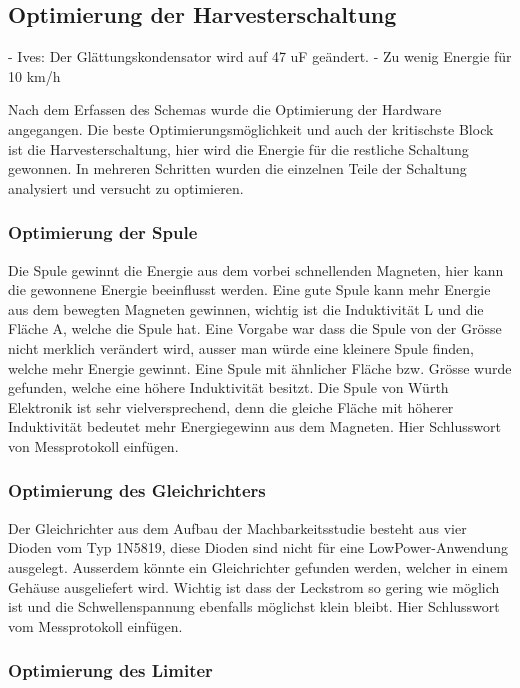 \subsection{Optimierung der Harvesterschaltung}
- Ives: Der Glättungskondensator wird auf 47 uF geändert. 
- Zu wenig Energie für 10 km/h

Nach dem Erfassen des Schemas wurde die Optimierung der Hardware angegangen. Die beste Optimierungsmöglichkeit und auch der kritischste Block ist die Harvesterschaltung, hier wird die Energie für die restliche Schaltung gewonnen. In mehreren Schritten wurden die einzelnen Teile der Schaltung analysiert und versucht zu optimieren.

\subsubsection{Optimierung der Spule}

Die Spule gewinnt die Energie aus dem vorbei schnellenden Magneten, hier kann die gewonnene Energie beeinflusst werden. Eine gute Spule kann mehr Energie aus dem bewegten Magneten gewinnen, wichtig ist die Induktivität L und die Fläche A, welche die Spule hat. Eine Vorgabe war dass die Spule von der Grösse nicht merklich verändert wird, ausser man würde eine kleinere Spule finden, welche mehr Energie gewinnt. Eine Spule mit ähnlicher Fläche bzw. Grösse wurde gefunden, welche eine höhere Induktivität besitzt. Die Spule von Würth Elektronik ist sehr vielversprechend, denn die gleiche Fläche mit höherer Induktivität bedeutet mehr Energiegewinn aus dem Magneten.
Hier Schlusswort von Messprotokoll einfügen.

\subsubsection{Optimierung des Gleichrichters}

Der Gleichrichter aus dem Aufbau der Machbarkeitsstudie besteht aus vier Dioden vom Typ 1N5819, diese Dioden sind nicht für eine LowPower-Anwendung ausgelegt. Ausserdem könnte ein Gleichrichter gefunden werden, welcher in einem Gehäuse ausgeliefert wird. Wichtig ist dass der Leckstrom so gering wie möglich ist und die Schwellenspannung ebenfalls möglichst klein bleibt. 
Hier Schlusswort vom Messprotokoll einfügen.

\subsubsection{Optimierung des Limiter}

